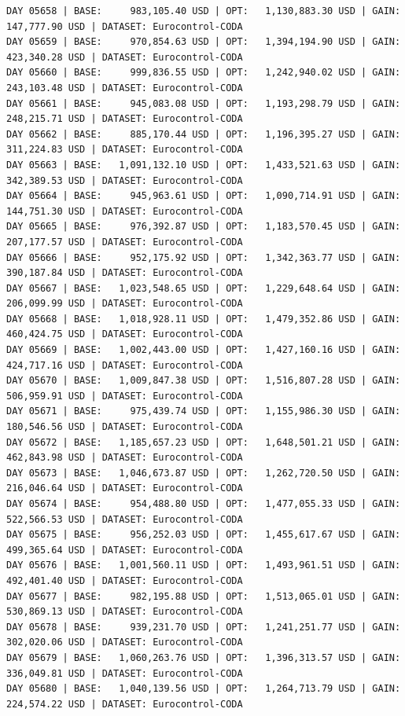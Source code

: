 \documentclass[11pt,a4paper]{article}
\begin{document}
\begin{verbatim}
DAY 05658 | BASE:     983,105.40 USD | OPT:   1,130,883.30 USD | GAIN: 147,777.90 USD | DATASET: Eurocontrol-CODA
DAY 05659 | BASE:     970,854.63 USD | OPT:   1,394,194.90 USD | GAIN: 423,340.28 USD | DATASET: Eurocontrol-CODA
DAY 05660 | BASE:     999,836.55 USD | OPT:   1,242,940.02 USD | GAIN: 243,103.48 USD | DATASET: Eurocontrol-CODA
DAY 05661 | BASE:     945,083.08 USD | OPT:   1,193,298.79 USD | GAIN: 248,215.71 USD | DATASET: Eurocontrol-CODA
DAY 05662 | BASE:     885,170.44 USD | OPT:   1,196,395.27 USD | GAIN: 311,224.83 USD | DATASET: Eurocontrol-CODA
DAY 05663 | BASE:   1,091,132.10 USD | OPT:   1,433,521.63 USD | GAIN: 342,389.53 USD | DATASET: Eurocontrol-CODA
DAY 05664 | BASE:     945,963.61 USD | OPT:   1,090,714.91 USD | GAIN: 144,751.30 USD | DATASET: Eurocontrol-CODA
DAY 05665 | BASE:     976,392.87 USD | OPT:   1,183,570.45 USD | GAIN: 207,177.57 USD | DATASET: Eurocontrol-CODA
DAY 05666 | BASE:     952,175.92 USD | OPT:   1,342,363.77 USD | GAIN: 390,187.84 USD | DATASET: Eurocontrol-CODA
DAY 05667 | BASE:   1,023,548.65 USD | OPT:   1,229,648.64 USD | GAIN: 206,099.99 USD | DATASET: Eurocontrol-CODA
DAY 05668 | BASE:   1,018,928.11 USD | OPT:   1,479,352.86 USD | GAIN: 460,424.75 USD | DATASET: Eurocontrol-CODA
DAY 05669 | BASE:   1,002,443.00 USD | OPT:   1,427,160.16 USD | GAIN: 424,717.16 USD | DATASET: Eurocontrol-CODA
DAY 05670 | BASE:   1,009,847.38 USD | OPT:   1,516,807.28 USD | GAIN: 506,959.91 USD | DATASET: Eurocontrol-CODA
DAY 05671 | BASE:     975,439.74 USD | OPT:   1,155,986.30 USD | GAIN: 180,546.56 USD | DATASET: Eurocontrol-CODA
DAY 05672 | BASE:   1,185,657.23 USD | OPT:   1,648,501.21 USD | GAIN: 462,843.98 USD | DATASET: Eurocontrol-CODA
DAY 05673 | BASE:   1,046,673.87 USD | OPT:   1,262,720.50 USD | GAIN: 216,046.64 USD | DATASET: Eurocontrol-CODA
DAY 05674 | BASE:     954,488.80 USD | OPT:   1,477,055.33 USD | GAIN: 522,566.53 USD | DATASET: Eurocontrol-CODA
DAY 05675 | BASE:     956,252.03 USD | OPT:   1,455,617.67 USD | GAIN: 499,365.64 USD | DATASET: Eurocontrol-CODA
DAY 05676 | BASE:   1,001,560.11 USD | OPT:   1,493,961.51 USD | GAIN: 492,401.40 USD | DATASET: Eurocontrol-CODA
DAY 05677 | BASE:     982,195.88 USD | OPT:   1,513,065.01 USD | GAIN: 530,869.13 USD | DATASET: Eurocontrol-CODA
DAY 05678 | BASE:     939,231.70 USD | OPT:   1,241,251.77 USD | GAIN: 302,020.06 USD | DATASET: Eurocontrol-CODA
DAY 05679 | BASE:   1,060,263.76 USD | OPT:   1,396,313.57 USD | GAIN: 336,049.81 USD | DATASET: Eurocontrol-CODA
DAY 05680 | BASE:   1,040,139.56 USD | OPT:   1,264,713.79 USD | GAIN: 224,574.22 USD | DATASET: Eurocontrol-CODA

\end{verbatim}
\end{document}
